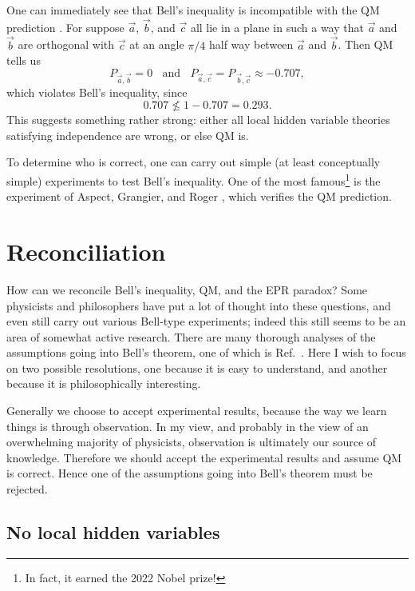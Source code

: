 One can immediately see that Bell's inequality is incompatible with
the QM prediction . For suppose $\vec{a}$, $\vec{b}$,
and $\vec{c}$ all lie in a plane in such a way that $\vec{a}$ and $\vec{b}$
are orthogonal with $\vec{c}$ at an angle $\pi/4$ half way between
$\vec{a}$ and $\vec{b}$. Then QM tells us
\begin{equation}
  P_{\vec{a},\vec{b}}=0~~~~\text{and}~~~~
  P_{\vec{a},\vec{c}}=P_{\,\vec{b},\vec{c}}\approx-0.707,
\end{equation}
which violates Bell's inequality, since
\begin{equation}
  0.707\nleq1-0.707=0.293.
\end{equation}
This suggests something rather strong: either all local hidden variable 
theories satisfying independence are wrong, or else QM is.

To determine who is correct, one can carry out simple (at least conceptually
simple) experiments to test Bell's inequality. One of the most 
famous\footnote{In fact, it earned the 2022 Nobel prize!}
is the experiment of Aspect, Grangier, and Roger
\cite{aspect_experimental_1982}, which verifies the QM prediction. 

\section{Reconciliation}\label{sec:interpretingBell}

How can we reconcile Bell's inequality, QM, and the EPR paradox? Some
physicists and philosophers have put a lot of thought into these questions,
and even still carry out various Bell-type experiments;
indeed this still seems to be an area of somewhat active research.
There are many thorough analyses of the assumptions going into Bell's
theorem, one of which is Ref.~\cite{platoStanfordBell}. Here I wish
to focus on two possible resolutions, one because it is
easy to understand, and another because it is philosophically interesting.

Generally we choose to accept experimental results, because the way we
learn things is through observation. In my view, and probably in the view
of an overwhelming majority of physicists, observation is ultimately
our source of knowledge. Therefore we should accept the experimental
results and assume QM is correct. Hence one of the assumptions going into
Bell's theorem must be rejected.

\subsection{No local hidden variables}

